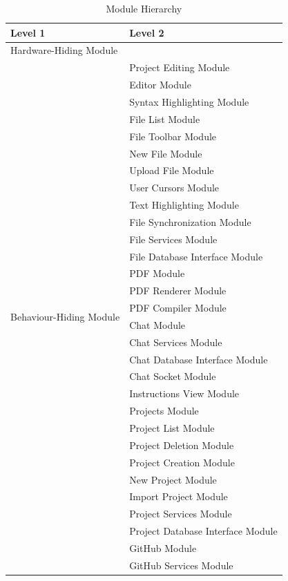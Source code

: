 \documentclass[12pt, titlepage]{article}
\begin{document}
	
	\begin{table}[H]
		\centering
		\scriptsize\begin{longtable}{p{} p{}}
			\caption{Module Hierarchy} \\
			\toprule
			\textbf{Level 1} & \textbf{Level 2}\\
			\midrule
			
			{Hardware-Hiding Module} & ~ \\
			\midrule
			
			\multirow{37}{0.3\textwidth}{Behaviour-Hiding Module}  & Project Editing Module \\
			& Editor Module \\
			& Syntax Highlighting Module \\
			& File List Module \\
			& File Toolbar Module \\
			& New File Module \\
			& Upload File Module \\
			& User Cursors Module \\
			& Text Highlighting Module \\
			& File Synchronization Module \\
			& File Services Module \\
			& File Database Interface Module \\
			& PDF Module \\
			& PDF Renderer Module \\
			& PDF Compiler Module \\
			& Chat Module \\
			& Chat Services Module \\
			& Chat Database Interface Module \\
			& Chat Socket Module \\
			& Instructions View Module \\
			& Projects Module \\
			& Project List Module \\
			& Project Deletion Module \\
			& Project Creation Module \\
			& New Project Module \\
			& Import Project Module \\
			& Project Services Module \\
			& Project Database Interface Module \\
			& GitHub Module \\
			& GitHub Services Module \\

\end{longtable}
\end{table}
\end{document}
